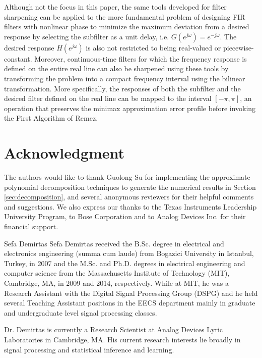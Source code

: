 \documentclass[journal] {IEEEtran}
\begin{document}
Although not the focus in this paper, the same tools developed for filter sharpening can be applied to the more fundamental problem of designing FIR filters with nonlinear phase to minimize the maximum deviation from a desired response by selecting the subfilter as a unit delay, i.e. $G(e^{j\omega})=e^{-j\omega}$. The desired response $H(e^{j\omega})$ is also not restricted to being real-valued or piecewise-constant. Moreover, continuous-time filters for which the frequency response is defined on the entire real line can also be sharpened using these tools by transforming the problem into a compact frequency interval using the bilinear transformation. More specifically, the responses of both the subfilter and the desired filter defined on the real line can be mapped to the interval $[-\pi,\pi]$, an operation that preserves the minimax approximation error profile before invoking the First Algorithm of Remez.







\section*{Acknowledgment}


The authors would like to thank Guolong Su for implementing the approximate polynomial decomposition techniques to generate the numerical results in Section \ref{sec:decomposition}, and several anonymous reviewers for their helpful comments and suggestions. We also express our thanks to the Texas Instruments Leadership University Program, to Bose Corporation and to Analog Devices Inc. for their financial support.

\ifCLASSOPTIONcaptionsoff
  \newpage
\fi












{}




\begin{IEEEbiography}{Sefa Demirtas}
Sefa Demirtas received the B.Sc. degree in electrical and electronics engineering (summa cum laude) from Bogazici University in Istanbul, Turkey, in 2007 and the M.Sc. and Ph.D. degrees in electrical engineering and computer science from the Massachusetts Institute of Technology (MIT), Cambridge, MA, in 2009 and 2014, respectively. While at MIT, he was a Research Assistant with the Digital Signal Processing Group (DSPG) and he held several Teaching Assistant positions in the EECS department mainly in graduate and undergraduate level signal processing classes.

Dr. Demirtas is currently a Research Scientist at Analog Devices Lyric Laboratories in Cambridge, MA. His current research interests lie broadly in signal processing and statistical inference and learning.
\end{IEEEbiography}
\end{document}
